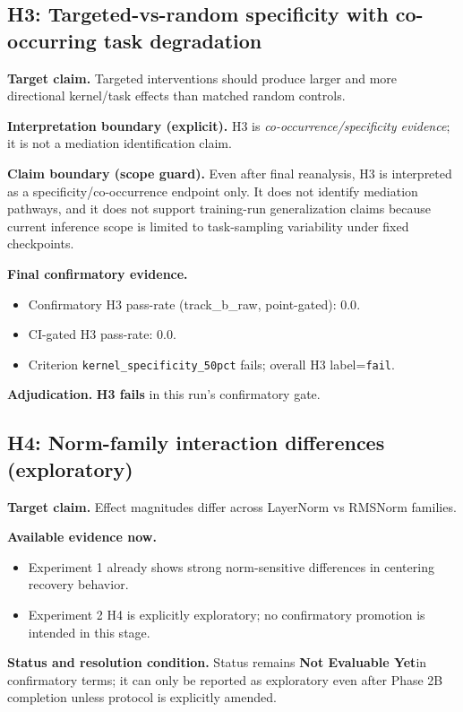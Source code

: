 \documentclass[11pt]{article}
\newcommand{\statusNotEval}{\textbf{Not Evaluable Yet}}
\begin{document}
\subsection{H3: Targeted-vs-random specificity with co-occurring task degradation}
\textbf{Target claim.} Targeted interventions should produce larger and more directional kernel/task effects than matched random controls.

\textbf{Interpretation boundary (explicit).}
H3 is \emph{co-occurrence/specificity evidence}; it is not a mediation identification claim.

\textbf{Claim boundary (scope guard).}
Even after final reanalysis, H3 is interpreted as a specificity/co-occurrence endpoint only. It does not identify mediation pathways, and it does not support training-run generalization claims because current inference scope is limited to task-sampling variability under fixed checkpoints.

\textbf{Final confirmatory evidence.}
\begin{itemize}[leftmargin=*]
  \item Confirmatory H3 pass-rate (track\_b\_raw, point-gated): \(0.0\).
  \item CI-gated H3 pass-rate: \(0.0\).
  \item Criterion \texttt{kernel\_specificity\_50pct} fails; overall H3 label=\texttt{fail}.
\end{itemize}

\textbf{Adjudication.} \textbf{H3 fails} in this run's confirmatory gate.

\subsection{H4: Norm-family interaction differences (exploratory)}
\textbf{Target claim.} Effect magnitudes differ across LayerNorm vs RMSNorm families.

\textbf{Available evidence now.}
\begin{itemize}[leftmargin=*]
  \item Experiment 1 already shows strong norm-sensitive differences in centering recovery behavior.
  \item Experiment 2 H4 is explicitly exploratory; no confirmatory promotion is intended in this stage.
\end{itemize}

\textbf{Status and resolution condition.}
Status remains \statusNotEval in confirmatory terms; it can only be reported as exploratory even after Phase 2B completion unless protocol is explicitly amended.
\end{document}

